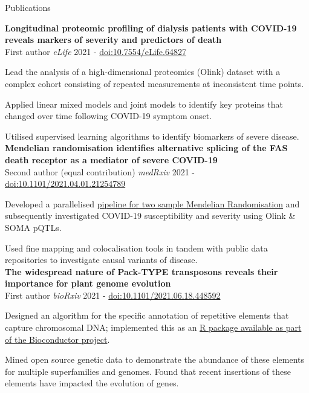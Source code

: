 \documentclass{resume}
\begin{document}
\begin{rSection}{Publications}

\vspace{1pt plus 1pt}
\textbf{Longitudinal proteomic profiling of dialysis patients with COVID-19 reveals markers of severity and predictors of death} \\
First author \hfill  \textit{eLife} 2021 - \href{https://doi.org/10.7554/eLife.64827}{doi:10.7554/eLife.64827}

\vspace{2pt plus 1pt minus 1pt}
\item Lead the analysis of a high-dimensional proteomics (Olink) dataset with a complex cohort consisting of repeated measurements at inconsistent time points.
\item Applied linear mixed models and joint models to identify key proteins that changed over time following COVID-19 symptom onset.
\item Utilised supervised learning algorithms to identify biomarkers of severe disease.\\

\textbf{Mendelian randomisation identifies alternative splicing of the FAS death receptor as a mediator of severe COVID-19} \\
Second author (equal contribution) \hfill  \textit{medRxiv} 2021 - \href{https://doi.org/10.1101/2021.04.01.21254789}{doi:10.1101/2021.04.01.21254789}

\vspace{2pt plus 1pt minus 1pt}
\item Developed a parallelised \href{https://github.com/jackgisby/mr-nextflow}{pipeline for two sample Mendelian Randomisation} and subsequently investigated COVID-19 susceptibility and severity using Olink \& SOMA pQTLs. 
\item Used fine mapping and colocalisation tools in tandem with public data repositories to investigate causal variants of disease. \\

\textbf{The widespread nature of Pack-TYPE transposons reveals their importance for plant genome evolution} \\
First author \hfill  \textit{bioRxiv} 2021 - \href{https://doi.org/10.1101/2021.06.18.448592}{doi:10.1101/2021.06.18.448592}

\vspace{2pt plus 1pt minus 1pt}
\item Designed an algorithm for the specific annotation of repetitive elements that capture chromosomal DNA; implemented this as an \href{https://bioconductor.org/packages/release/bioc/html/packFinder.html}{R package available as part of the Bioconductor project}.
\item Mined open source genetic data to demonstrate the abundance of these elements for multiple superfamilies and genomes. Found that recent insertions of these elements have impacted the evolution of genes. \\


\end{rSection}
\end{document}
